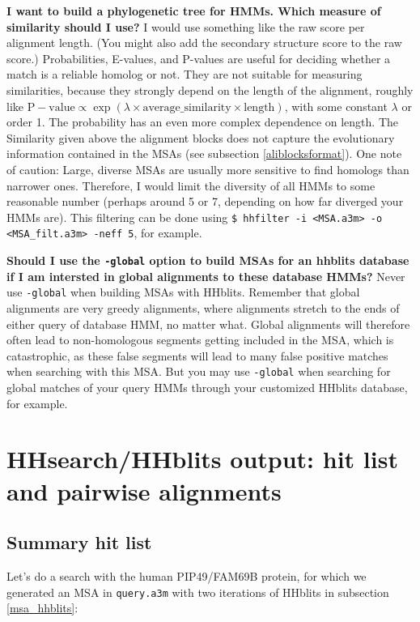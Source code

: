 \documentclass[11pt,a4paper]{article}
\begin{document}
{\bf I want to build a phylogenetic tree for HMMs. Which measure of similarity should I use?}
I would use something like the raw score per alignment length. (You might also add the secondary structure score to the raw score.) Probabilities, E-values, and P-values are useful for deciding whether a match is a reliable homolog or not. They are not suitable for measuring similarities, because they strongly depend on the length of the alignment, roughly like $\mathrm{P-value} \propto \exp(\lambda \times \mathrm{average\_similarity} \times \mathrm{length})$, with some constant $\lambda$ or order 1. The probability has an even more complex dependence on length. The Similarity given above the alignment blocks does not capture the evolutionary information contained in the MSAs (see subsection \ref{aliblocksformat}). One note of caution: Large, diverse MSAs are usually more sensitive to find homologs than narrower ones. Therefore, I would limit the diversity of all HMMs to some reasonable number (perhaps around 5 or 7, depending on how far diverged your HMMs are). This filtering can be done using \verb`$ hhfilter -i <MSA.a3m> -o <MSA_filt.a3m> -neff 5`, for example. 

{\bf Should I use the \verb`-global` option to build MSAs for an hhblits database if I am intersted in global alignments to these database HMMs?}
Never use \verb`-global` when building MSAs with HHblits. Remember that global alignments are very greedy alignments, where alignments stretch to the ends of either query of database HMM, no matter what. Global alignments will therefore often lead to non-homologous segments getting included in the MSA, which is catastrophic, as these false segments will lead to many false positive matches when searching with this MSA. But you may use \verb`-global` when searching for global matches of your query HMMs through your customized HHblits database, for example.


\section{HHsearch/HHblits output: hit list and pairwise alignments}\label{outformat}

\subsection{Summary hit list}

Let's do a search with the human PIP49/FAM69B protein, for which we generated an MSA in \verb`query.a3m` with two iterations of HHblits in subsection \ref{msa_hhblits}:
\end{document}
